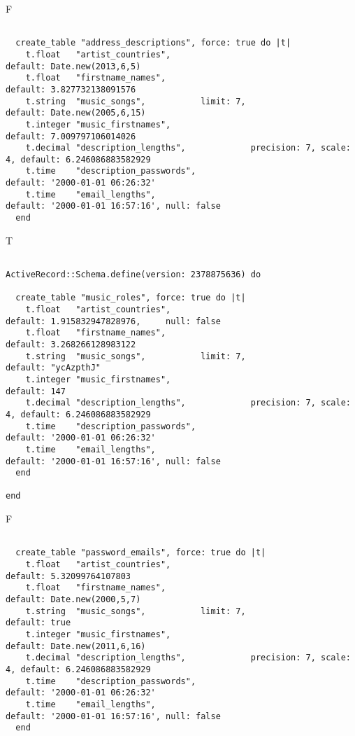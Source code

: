 F
\begin{verbatim}

  create_table "address_descriptions", force: true do |t|
    t.float   "artist_countries",                                        default: Date.new(2013,6,5)
    t.float   "firstname_names",                                         default: 3.827732138091576
    t.string  "music_songs",           limit: 7,                         default: Date.new(2005,6,15)
    t.integer "music_firstnames",                                        default: 7.009797106014026
    t.decimal "description_lengths",             precision: 7, scale: 4, default: 6.246086883582929
    t.time    "description_passwords",                                   default: '2000-01-01 06:26:32'
    t.time    "email_lengths",                                           default: '2000-01-01 16:57:16', null: false
  end

\end{verbatim}

T
\begin{verbatim}

ActiveRecord::Schema.define(version: 2378875636) do

  create_table "music_roles", force: true do |t|
    t.float   "artist_countries",                                        default: 1.915832947828976,     null: false
    t.float   "firstname_names",                                         default: 3.268266128983122
    t.string  "music_songs",           limit: 7,                         default: "ycAzpthJ"
    t.integer "music_firstnames",                                        default: 147
    t.decimal "description_lengths",             precision: 7, scale: 4, default: 6.246086883582929
    t.time    "description_passwords",                                   default: '2000-01-01 06:26:32'
    t.time    "email_lengths",                                           default: '2000-01-01 16:57:16', null: false
  end

end
\end{verbatim}


F
\begin{verbatim}

  create_table "password_emails", force: true do |t|
    t.float   "artist_countries",                                        default: 5.32099764107803
    t.float   "firstname_names",                                         default: Date.new(2000,5,7)
    t.string  "music_songs",           limit: 7,                         default: true
    t.integer "music_firstnames",                                        default: Date.new(2011,6,16)
    t.decimal "description_lengths",             precision: 7, scale: 4, default: 6.246086883582929
    t.time    "description_passwords",                                   default: '2000-01-01 06:26:32'
    t.time    "email_lengths",                                           default: '2000-01-01 16:57:16', null: false
  end

\end{verbatim}

